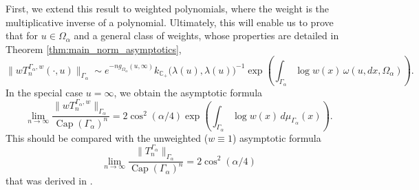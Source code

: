 \documentclass[12pt,oneside,reqno]{amsart}
\theoremstyle{definition}
\numberwithin{equation}{section}
\newcommand{\C}{{\mathbb C}}
\renewcommand{\Cap}{\operatorname{Cap}}
\begin{document}
First, we extend this result to weighted polynomials, where the weight is the multiplicative inverse of a polynomial. Ultimately, this will enable us to prove that for $u\in \Omega_\alpha$ and a general class of weights, whose properties are detailed in Theorem \ref{thm:main_norm_asymptotics},
\begin{equation}
	\|wT_n^{\Gamma_{\alpha},w}(\cdot ,u)\|_{\Gamma_\alpha} \sim e^{-ng_{\Omega_\alpha}(u,\infty)}k_{\C_+}\bigl(\lambda(u),\lambda(u)\bigr)^{-1}\exp\left(\int_{\Gamma_\alpha}\log w(x)\,\omega(u,dx,\Omega_{\alpha})\right).
	\label{eq:residual_norm_asymptotics}
\end{equation}
In the special case $u = \infty$, we obtain the asymptotic formula
\begin{equation}
	\lim_{n\rightarrow \infty}\frac{\|wT_n^{\Gamma_{\alpha},w}\|_{\Gamma_\alpha}}{\Cap(\Gamma_\alpha)^n}= 2\cos^2(\alpha/4)\exp\left(\int_{\Gamma_\alpha}\log w(x)\,d\mu_{\Gamma_\alpha}(x)\right).
	\label{eq:chebyshev_norm_asymptotics}
\end{equation}
This should be compared with the unweighted ($w\equiv 1$) asymptotic formula
\begin{equation}
\lim_{n\rightarrow \infty}\frac{\|T_n^{\Gamma_\alpha}\|_{\Gamma_\alpha}}{\Cap(\Gamma_\alpha)^n} = 2\cos^2(\alpha/4)
\end{equation}
that was derived in \cite{thiran-detaille91}. 
\end{document}

